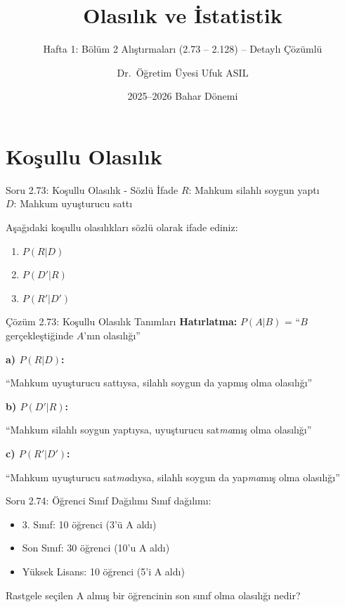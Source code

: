 \documentclass[light]{lutbeamer}
\institute[Yazılım Mühendisliği]{YAZILIM MÜHENDİSLİĞİ BÖLÜMÜ}
\author{Dr.~Öğretim Üyesi Ufuk ASIL}
\title{Olasılık ve İstatistik}
\subtitle{Hafta 1: Bölüm 2 Alıştırmaları (2.73 -- 2.128) -- Detaylı Çözümlü}
\date{2025--2026 Bahar Dönemi}
\begin{document}
\maketitle{}

\section{Koşullu Olasılık}

\begin{frame}{Soru 2.73: Koşullu Olasılık - Sözlü İfade}
    $R$: Mahkum silahlı soygun yaptı \\
    $D$: Mahkum uyuşturucu sattı
    
    Aşağıdaki koşullu olasılıkları sözlü olarak ifade ediniz:
    \begin{enumerate}
        \item $P(R|D)$
        \item $P(D'|R)$
        \item $P(R'|D')$
    \end{enumerate}
\end{frame}

\begin{frame}{Çözüm 2.73: Koşullu Olasılık Tanımları}
    \color{blue}
    \textbf{Hatırlatma:} $P(A|B)$ = ``$B$ gerçekleştiğinde $A$'nın olasılığı''
    
    \vspace{0.5cm}
    \textbf{a) $P(R|D)$:}
    
    ``Mahkum uyuşturucu sattıysa, silahlı soygun da yapmış olma olasılığı''
    
    \vspace{0.5cm}
    \textbf{b) $P(D'|R)$:}
    
    ``Mahkum silahlı soygun yaptıysa, uyuşturucu sat\emph{ma}mış olma olasılığı''
    
    \vspace{0.5cm}
    \textbf{c) $P(R'|D')$:}
    
    ``Mahkum uyuşturucu sat\emph{ma}dıysa, silahlı soygun da yap\emph{ma}mış olma olasılığı''
\end{frame}

\begin{frame}{Soru 2.74: Öğrenci Sınıf Dağılımı}
    \small
    Sınıf dağılımı:
    \begin{itemize}
        \item 3. Sınıf: 10 öğrenci (3'ü A aldı)
        \item Son Sınıf: 30 öğrenci (10'u A aldı)
        \item Yüksek Lisans: 10 öğrenci (5'i A aldı)
    \end{itemize}
    
    Rastgele seçilen A almış bir öğrencinin son sınıf olma olasılığı nedir?
\end{frame}
\end{document}

